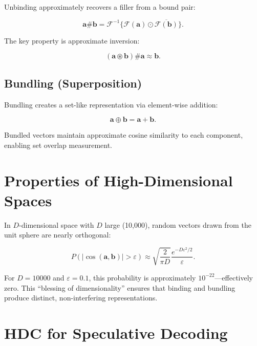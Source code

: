 \documentclass[11pt,a4paper,openright]{book}
\begin{document}
Unbinding approximately recovers a filler from a bound pair:

\begin{equation}
	\label{eq:hrr_unbind}
	\mathbf{a} \# \mathbf{b} = \mathcal{F}^{-1}\{\mathcal{F}(\mathbf{a}) \odot \overline{\mathcal{F}(\mathbf{b})}\}.
\end{equation}

The key property is approximate inversion:

\begin{equation}
	\label{eq:hrr_inverse}
	(\mathbf{a} \circledast \mathbf{b}) \# \mathbf{a} \approx \mathbf{b}.
\end{equation}

\subsection{Bundling (Superposition)}

Bundling creates a set-like representation via element-wise addition:

\begin{equation}
	\label{eq:hrr_bundle}
	\mathbf{a} \oplus \mathbf{b} = \mathbf{a} + \mathbf{b}.
\end{equation}

Bundled vectors maintain approximate cosine similarity to each component, enabling set overlap measurement.

\section{Properties of High-Dimensional Spaces}

In $D$-dimensional space with $D$ large (10,000), random vectors drawn from the unit sphere are nearly orthogonal:

\begin{equation}
	\label{eq:hd_orthogonality}
	P(|\cos(\mathbf{a}, \mathbf{b})| > \varepsilon) \approx \sqrt{\frac{2}{\pi D}} \frac{e^{-D\varepsilon^2/2}}{\varepsilon}.
\end{equation}

For $D=10000$ and $\varepsilon=0.1$, this probability is approximately $10^{-22}$---effectively zero. This ``blessing of dimensionality'' ensures that binding and bundling produce distinct, non-interfering representations.

\section{HDC for Speculative Decoding}
\end{document}
